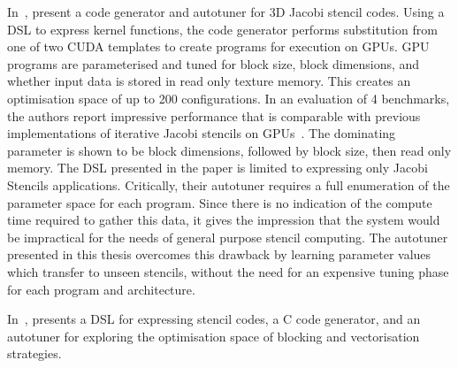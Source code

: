 In~\cite{Zhang2013a}, \citeauthor{Zhang2013a} present a code generator
and autotuner for 3D Jacobi stencil codes. Using a DSL to express
kernel functions, the code generator performs substitution from one of
two CUDA templates to create programs for execution on GPUs. GPU
programs are parameterised and tuned for block size, block dimensions,
and whether input data is stored in read only texture memory. This
creates an optimisation space of up to 200 configurations. In an
evaluation of 4 benchmarks, the authors report impressive performance
that is comparable with previous implementations of iterative Jacobi
stencils on GPUs~\cite{Holewinski2012, Phillips2010}. The dominating
parameter is shown to be block dimensions, followed by block size,
then read only memory. The DSL presented in the paper is limited to
expressing only Jacobi Stencils applications. Critically, their
autotuner requires a full enumeration of the parameter space for each
program. Since there is no indication of the compute time required to
gather this data, it gives the impression that the system would be
impractical for the needs of general purpose stencil computing. The
autotuner presented in this thesis overcomes this drawback by learning
parameter values which transfer to unseen stencils, without the need
for an expensive tuning phase for each program and architecture.
%

In~\cite{Christen2011}, \citeauthor{Christen2011} presents a DSL for
expressing stencil codes, a C code generator, and an autotuner for
exploring the optimisation space of blocking and vectorisation
strategies. 

